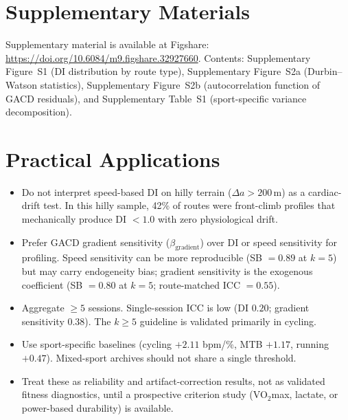\documentclass[times, twoside]{zHenriquesLab-StyleBioRxiv}
\begin{document}
\section*{Supplementary Materials}

Supplementary material is available at Figshare: \url{https://doi.org/10.6084/m9.figshare.32927660}. Contents: Supplementary Figure~S1 (DI distribution by route type), Supplementary Figure~S2a (Durbin--Watson statistics), Supplementary Figure~S2b (autocorrelation function of GACD residuals), and Supplementary Table~S1 (sport-specific variance decomposition).

\section*{Practical Applications}

\begin{itemize}
  \item Do not interpret speed-based DI on hilly terrain ($\Delta a > 200\,\mathrm{m}$) as a cardiac-drift test. In this hilly sample, 42\% of routes were front-climb profiles that mechanically produce DI $< 1.0$ with zero physiological drift.
  \item Prefer GACD gradient sensitivity ($\beta_{\text{gradient}}$) over DI or speed sensitivity for profiling. Speed sensitivity can be more reproducible (SB $= 0.89$ at $k = 5$) but may carry endogeneity bias; gradient sensitivity is the exogenous coefficient (SB $= 0.80$ at $k = 5$; route-matched ICC $= 0.55$).
  \item Aggregate $\geq 5$ sessions. Single-session ICC is low (DI $0.20$; gradient sensitivity $0.38$). The $k \geq 5$ guideline is validated primarily in cycling.
  \item Use sport-specific baselines (cycling $+2.11$ bpm/\%, MTB $+1.17$, running $+0.47$). Mixed-sport archives should not share a single threshold.
  \item Treat these as reliability and artifact-correction results, not as validated fitness diagnostics, until a prospective criterion study (VO$_2$max, lactate, or power-based durability) is available.
\end{itemize}
\end{document}
